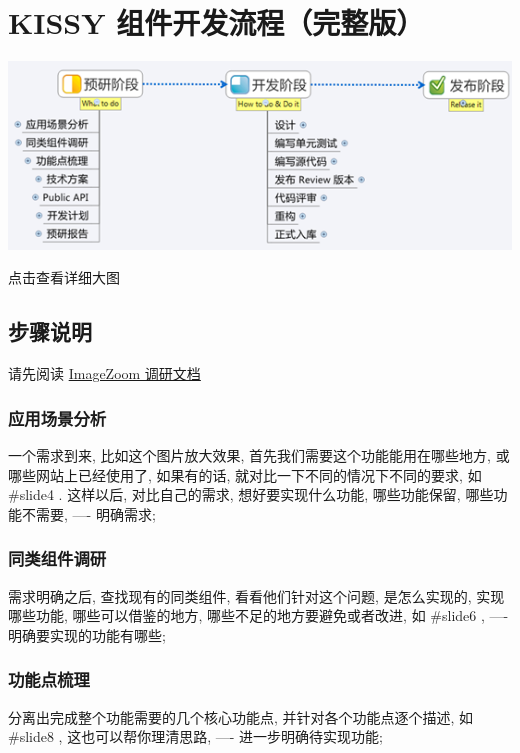 \documentclass[letterpaper,10pt,english]{sphinxmanual}
\begin{document}
\section{KISSY 组件开发流程（完整版）}
\label{workflow/workflow-full:workflow-full}\label{workflow/workflow-full::doc}\label{workflow/workflow-full:kissy}
\includegraphics{workflow-s1.png}

点击查看详细大图


\subsection{步骤说明}
\label{workflow/workflow-full:id2}
请先阅读 \href{http://kissyteam.github.com/kissy/src/imagezoom/slide.html}{ImageZoom 调研文档}


\subsubsection{应用场景分析}
\label{workflow/workflow-full:id3}
一个需求到来, 比如这个图片放大效果, 首先我们需要这个功能能用在哪些地方, 或哪些网站上已经使用了, 如果有的话, 就对比一下不同的情况下不同的要求, 如 \#slide4 . 这样以后, 对比自己的需求, 想好要实现什么功能, 哪些功能保留, 哪些功能不需要, ---- 明确需求;


\subsubsection{同类组件调研}
\label{workflow/workflow-full:id4}
需求明确之后, 查找现有的同类组件, 看看他们针对这个问题, 是怎么实现的, 实现哪些功能, 哪些可以借鉴的地方, 哪些不足的地方要避免或者改进, 如 \#slide6 , ---- 明确要实现的功能有哪些;


\subsubsection{功能点梳理}
\label{workflow/workflow-full:id5}
分离出完成整个功能需要的几个核心功能点, 并针对各个功能点逐个描述, 如 \#slide8 , 这也可以帮你理清思路,  ---- 进一步明确待实现功能;
\end{document}
